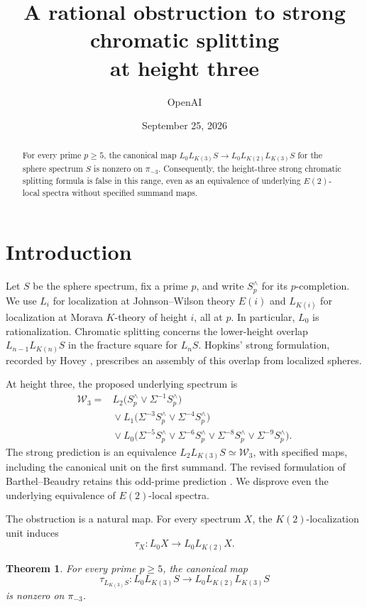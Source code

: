 \documentclass[11pt]{article}
\title{A rational obstruction to strong chromatic splitting\\at height three}
\author{OpenAI}
\date{September 25, 2026}
\numberwithin{equation}{section}
\newtheorem{theorem}{Theorem}[section]
\theoremstyle{definition}
\theoremstyle{remark}
\begin{document}
\begin{abstract}
For every prime \(p\ge5\), the canonical map
\(L_0L_{K(3)}S\to L_0L_{K(2)}L_{K(3)}S\) for the sphere spectrum \(S\)
is nonzero on \(\pi_{-3}\). Consequently, the height-three strong chromatic
splitting formula is false in this range, even as an equivalence of
underlying \(E(2)\)-local spectra without specified summand maps.
\end{abstract}
\tableofcontents
\section{Introduction}
\label{sec:introduction}

Let \(S\) be the sphere spectrum, fix a prime \(p\), and write
\(S_p^\wedge\) for its \(p\)-completion. We use \(L_i\) for localization
at Johnson--Wilson theory \(E(i)\) and \(L_{K(i)}\) for localization at
Morava \(K\)-theory of height \(i\), all at \(p\). In particular, \(L_0\)
is rationalization. Chromatic splitting concerns the lower-height
overlap \(L_{n-1}L_{K(n)}S\) in the fracture square for \(L_nS\).
Hopkins' strong formulation, recorded by Hovey
\cite[Conjecture~4.2]{Hovey1995}, prescribes an assembly of this overlap
from localized spheres.

At height three, the proposed underlying spectrum is
\begin{equation}\label{eq:proposed-wedge}
\begin{aligned}
 \mathcal W_3={}&L_2\bigl(S_p^\wedge\vee\Sigma^{-1}S_p^\wedge\bigr)\\
 &{}\vee L_1\bigl(\Sigma^{-3}S_p^\wedge\vee\Sigma^{-4}S_p^\wedge\bigr)\\
 &{}\vee L_0\bigl(\Sigma^{-5}S_p^\wedge\vee\Sigma^{-6}S_p^\wedge
             \vee\Sigma^{-8}S_p^\wedge\vee\Sigma^{-9}S_p^\wedge\bigr).
\end{aligned}
\end{equation}
The strong prediction is an equivalence
\(L_2L_{K(3)}S\simeq\mathcal W_3\), with specified maps, including the
canonical unit on the first summand. The revised formulation of
Barthel--Beaudry retains this odd-prime prediction
\cite[Conjecture~6.3 and Remark~6.4]{BB2019}. We disprove even the
underlying equivalence of \(E(2)\)-local spectra.

The obstruction is a natural map. For every spectrum \(X\), the
\(K(2)\)-localization unit induces
\[
 \tau_X:L_0X\longrightarrow L_0L_{K(2)}X.
\]

\begin{theorem}\label{thm:main}
For every prime \(p\geq5\), the canonical map
\begin{equation}\label{eq:main-map}
 \tau_{L_{K(3)}S}:L_0L_{K(3)}S\longrightarrow
                         L_0L_{K(2)}L_{K(3)}S
\end{equation}
is nonzero on \(\pi_{-3}\).
\end{theorem}
\end{document}

